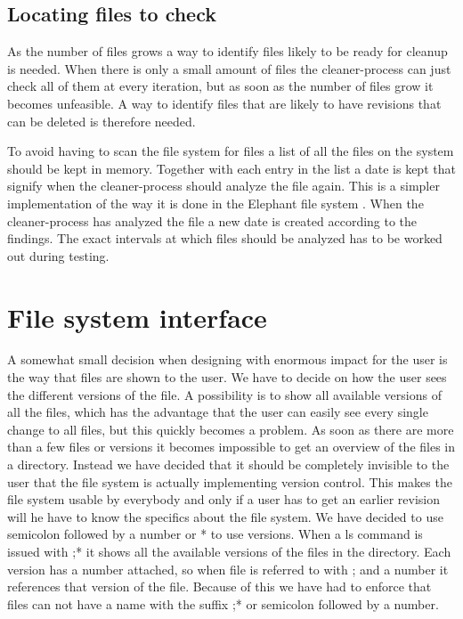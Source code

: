 \documentclass[12pt]{article}
\begin{document}
\subsection{Locating files to check}
As the number of files grows a way to identify files likely to be
ready for cleanup is needed. When there is only a small amount of
files the cleaner-process can just check all of them at every
iteration, but as soon as the number of files grow it becomes
unfeasible. A way to identify files that are likely to have revisions
that can be deleted is therefore needed.

To avoid having to scan the file system for files a list of all the
files on the system should be kept in memory. Together with each entry
in the list a date is kept that signify when the cleaner-process
should analyze the file again. This is a simpler implementation of the
way it is done in the Elephant file system \cite{Santry:1999gf}. When
the cleaner-process has analyzed the file a new date is created
according to the findings. The exact intervals at which files should
be analyzed has to be worked out during testing.

\section{File system interface}

A somewhat small decision when designing with enormous impact for the
user is the way that files are shown to the user.
We have to decide on how the user sees the different versions of the
file. A possibility is to show all available versions of all the
files,
which has the advantage that the user can easily see every single
change to all files, but this quickly becomes a problem.
As soon as there are more than a few files or versions it becomes
impossible to get an overview of the files in a directory.
Instead we have decided that it should be completely invisible to the
user that the file system is actually implementing version control.
This makes the file system usable by everybody and only if a user has
to get an earlier revision will he have to know the specifics about
the file system.
We have decided to use semicolon followed by a number or * to use
versions.
When a ls command is issued with ;* it shows all the available
versions of the files in the directory.
Each version has a number attached, so when file is referred to with ;
and a number it references that version of the file.
Because of this we have had to enforce that files can not have a name
with the suffix ;* or semicolon followed by a number.
\end{document}
